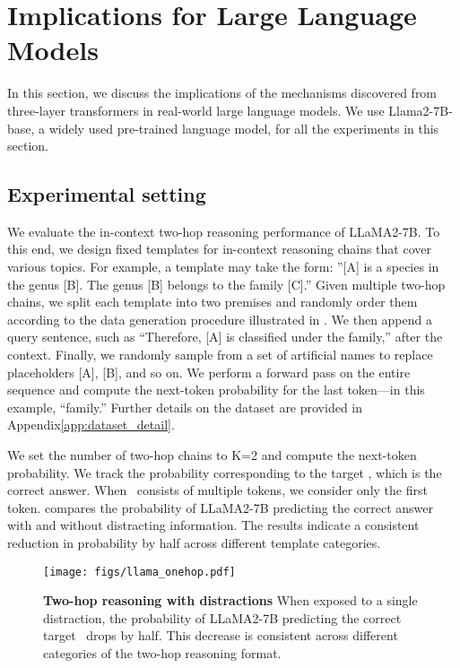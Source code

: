 \section{Implications for Large Language Models}
\label{sec:impl_llm}
In this section, we discuss the implications of the mechanisms discovered from three-layer transformers in real-world large language models. We use Llama2-7B-base, a widely used pre-trained language model, for all the experiments in this section.

\subsection{Experimental setting}
\label{sec:llama-initial}
We evaluate the in-context two-hop reasoning performance of LLaMA2-7B. To this end, we design fixed templates for in-context reasoning chains that cover various topics. For example, a template may take the form: ”[A] is a species in the genus [B]. The genus [B] belongs to the family [C].” Given multiple two-hop chains, we split each template into two premises and randomly order them according to the data generation procedure illustrated in .
We then append a query sentence, such as “Therefore, [A] is classified under the family,” after the context. Finally, we randomly sample from a set of artificial names to replace placeholders [A], [B], and so on. We perform a forward pass on the entire sequence and compute the next-token probability for the last token—in this example, “family.” Further details on the dataset are provided in Appendix\ref{app:dataset_detail}.

We set the number of two-hop chains to  K=2  and compute the next-token probability. We track the probability corresponding to the target \Ed, which is the correct answer. When \Ed~consists of multiple tokens, we consider only the first token.  compares the probability of LLaMA2-7B predicting the correct answer with and without distracting information. The results indicate a consistent reduction in probability by half across different template categories.

\begin{figure}[h]
    \centering
    \texttt{[image: figs/llama\_onehop.pdf]}
    \caption{\textbf{Two-hop reasoning with distractions} When exposed to a single distraction, the probability of LLaMA2-7B predicting the correct target \Ed~drops by half. This decrease is consistent across different categories of the two-hop reasoning format.}
    \label{fig:llm-onehop}
\end{figure}

